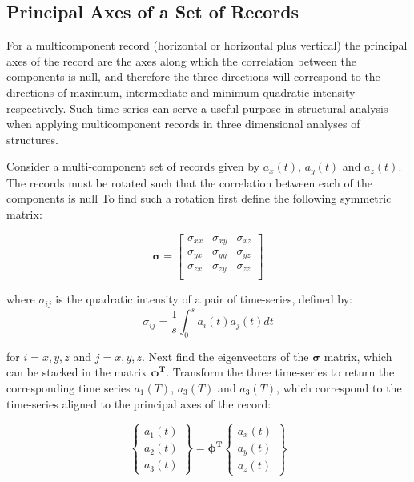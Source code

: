 \subsection{Principal Axes of a Set of Records}

For a multicomponent record (horizontal or horizontal plus vertical) the principal axes of the record are the axes along which the correlation between the components is null, and therefore the three directions will correspond to the directions of maximum, intermediate and minimum quadratic intensity respectively. Such time-series can serve a useful purpose in structural analysis when applying multicomponent records in three dimensional analyses of structures. 

Consider a multi-component set of records given by $a_x \left( t \right)$,  $a_y \left( t \right)$ and $a_z \left( t \right)$. The records must be rotated such that the correlation between each of the components is null To find such a rotation first define the following symmetric matrix:
 
\begin{equation}
\mathbf{\sigma} = \begin{bmatrix}
\sigma_{xx} & \sigma_{xy} & \sigma_{xz} \\
\sigma_{yx} & \sigma_{yy} & \sigma_{yz} \\
\sigma_{zx} & \sigma_{zy} & \sigma_{zz} \\
\end{bmatrix}
\end{equation}

\noindent where $\sigma_{ij}$ is the quadratic intensity of a pair of time-series, defined by:
\begin{equation}
\sigma_{ij} = \frac{1}{s} \int_0^s a_i \left( t \right) a_j \left( t \right) dt
\end{equation}

\noindent for $i=x,y,z$ and $j=x,y,z$. Next find the eigenvectors of the $\mathbf{\sigma}$ matrix, which can be stacked in the matrix $\mathbf{\phi^T}$. Transform the three time-series to return the corresponding time series $a_1 \left( T \right)$, $a_3 \left( T \right)$ and $a_3 \left( T \right)$, which correspond to the time-series aligned to the principal axes of the record:

\begin{equation}
\begin{Bmatrix} a_1 \left( t \right) \\ a_2 \left( t \right) \\ a_3 \left( t \right)\end{Bmatrix} = \mathbf{\phi^T} \begin{Bmatrix} a_x \left( t \right) \\ a_y \left( t \right) \\ a_z \left( t \right)\end{Bmatrix}
\end{equation}

